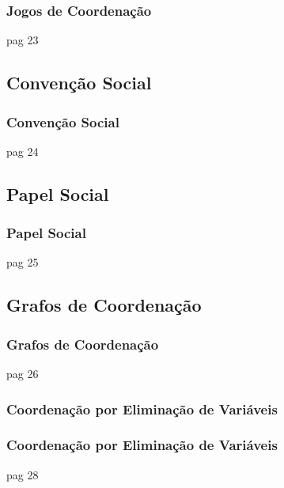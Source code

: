 \begin{frame}
\frametitle{Jogos de Coordenação}

pag 23


\end{frame}


\subsection{Convenção Social}

\begin{frame}
\frametitle{Convenção Social}

pag 24


\end{frame}

\subsection{Papel Social}

\begin{frame}
\frametitle{Papel Social}

pag 25


\end{frame}



\subsection{Grafos de Coordenação}

\begin{frame}
\frametitle{Grafos de Coordenação}

pag 26


\end{frame}


\subsubsection{Coordenação por Eliminação de Variáveis}

\begin{frame}
\frametitle{Coordenação por Eliminação de Variáveis}

pag 28


\end{frame}


